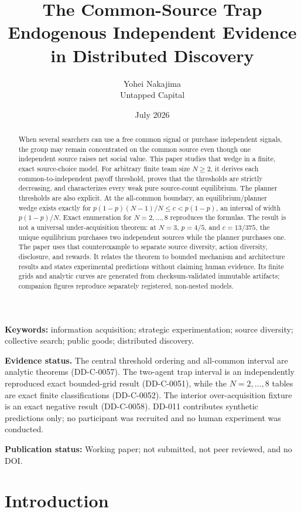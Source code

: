 \documentclass[11pt]{article}
\title{\textbf{The Common-Source Trap}\\[0.35em]\large Endogenous Independent Evidence in Distributed Discovery}
\author{Yohei Nakajima\\Untapped Capital}
\date{July 2026}
\newcommand{\Evidence}[1]{\par\noindent\textbf{Evidence status.} #1\par}
\begin{document}
\maketitle

\begin{abstract}
When several searchers can use a free common signal or purchase independent
signals, the group may remain concentrated on the common source even though one
independent source raises net social value. This paper studies that wedge in a
finite, exact source-choice model. For arbitrary finite team size $N\geq2$, it
derives each common-to-independent payoff threshold, proves that the thresholds
are strictly decreasing, and characterizes every weak pure source-count
equilibrium. The planner thresholds are also explicit. At the all-common
boundary, an equilibrium/planner wedge exists exactly for
$p(1-p)(N-1)/N\leq c<p(1-p)$, an interval of width $p(1-p)/N$. Exact
enumeration for $N=2,\ldots,8$ reproduces the formulas. The result is not a universal under-acquisition theorem:
at $N=3$, $p=4/5$, and $c=13/375$, the
unique equilibrium purchases two independent sources while the planner
purchases one. The paper uses that counterexample to separate source diversity,
action diversity, disclosure, and rewards. It relates the theorem to bounded
mechanism and architecture results and states experimental predictions without
claiming human evidence. Its finite grids and analytic curves are generated
from checksum-validated immutable artifacts; companion figures reproduce
separately registered, non-nested models.
\end{abstract}

\noindent\textbf{Keywords:} information acquisition; strategic experimentation;
source diversity; collective search; public goods; distributed discovery.

\Evidence{The central threshold ordering and all-common interval are analytic
theorems (DD-C-0057). The two-agent trap interval is an independently reproduced exact bounded-grid result (DD-C-0051), while the
$N=2,\ldots,8$ tables are exact finite classifications (DD-C-0052). The
interior over-acquisition fixture is an exact negative result (DD-C-0058).
DD-011 contributes synthetic predictions only; no participant was recruited
and no human experiment was conducted.}
\noindent\textbf{Publication status:} Working paper; not submitted, not peer
reviewed, and no DOI.



\section{Introduction}
\end{document}
